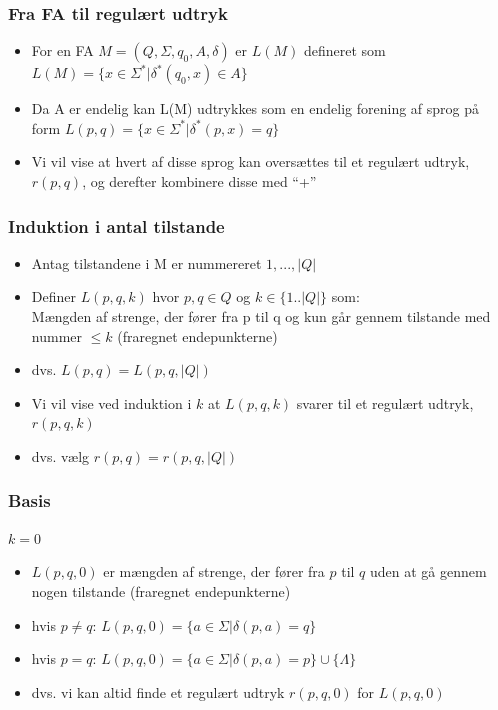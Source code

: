 \begin{frame}
\frametitle{Fra FA til regulært udtryk}
\begin{itemize}[<+->]
\item For en FA $M=(Q, \Sigma , q_0, A, \delta )$ er $L(M)$ defineret som
	$L(M) = \{ x\in \Sigma^* | \delta^*(q_0, x)\in A \}$
\item Da A er endelig kan L(M) udtrykkes som en endelig forening af sprog på form
	 $L(p, q) = \{ x\in \Sigma^* | \delta^*(p, x)=q \}$
\item Vi vil vise at hvert af disse sprog kan oversættes til et regulært udtryk, $r(p, q)$, og derefter kombinere disse med “+”
\end{itemize}
\end{frame}
\begin{frame}
\frametitle{Induktion i antal tilstande}
\begin{itemize}[<+->]
\item Antag tilstandene i M er nummereret $1, ..., |Q|$
\item Definer $L(p, q, k)$ hvor $p,q\in Q$ og $k\in \{1..|Q|\}$ som: \\
  Mængden af strenge, der fører fra p til q og kun går gennem
  tilstande med nummer $\leq k$ (fraregnet endepunkterne)\\
\item dvs.  $L(p, q) = L(p, q, |Q|)$
\item Vi vil vise ved induktion i $k$ at $L(p, q, k)$ svarer til 
et regulært udtryk, $r(p, q, k)$
\item dvs. vælg  $r(p, q) = r(p, q, |Q|)$
\end{itemize}
\end{frame}
\begin{frame}
\frametitle{Basis}
$k = 0$
\begin{itemize}[<+->]
\item 
$L(p, q, 0)$ er mængden af strenge, der fører fra 
$p$ til $q$ uden at gå gennem nogen tilstande 
(fraregnet endepunkterne)
\item
hvis $p\neq q$: 
$L(p, q, 0) = \{ a\in \Sigma  | \delta (p, a) = q \}$
\item
hvis $p=q$: 
$L(p, q, 0) = \{ a\in \Sigma  | \delta (p, a) = p \} \cup \{\Lambda\}$
\item
dvs. vi kan altid finde et regulært udtryk 
$r(p, q, 0)$ for $L(p, q, 0)$
\end{itemize}
\end{frame}
